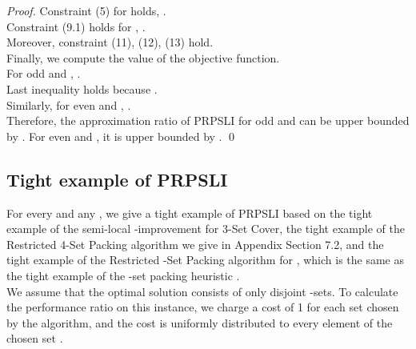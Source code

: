 \documentclass[runningheads,a4paper]{llncs}
\numberwithin{equation}{section}
\begin{document}
\begin{proof}
Constraint (5) for  holds, .\\

Constraint (9.1) holds for , . \\

Moreover, constraint (11), (12), (13) hold. \\

Finally, we compute the value of the objective function. \\

For odd  and ,
. \\

Last inequality holds because . \\

Similarly, for even  and , . \\


Therefore, the approximation ratio of PRPSLI for odd  and  can be upper bounded by . For even  and , it is upper bounded by . \qed
\end{proof}


\subsection{Tight example of PRPSLI}
For every  and any , we give a tight example of PRPSLI based on the tight example of the semi-local -improvement \cite{furer} for 3-Set Cover, the tight example of the Restricted 4-Set Packing algorithm we give in Appendix Section 7.2, and the tight example of the Restricted -Set Packing algorithm for , which is the same as the tight example of the -set packing heuristic \cite{schrijver}. \\

We assume that the optimal solution  consists of only disjoint -sets. To calculate the performance ratio on this instance, we charge a cost of 1 for each set chosen by the algorithm, and the cost is uniformly distributed to every element of the chosen set \cite{furer}.
\end{document}
